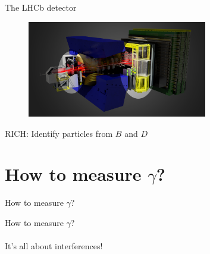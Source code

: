 \documentclass[dvipsnames]{beamer}
\begin{document}
\begin{frame}{The LHCb detector}
  \begin{figure}
    \centering
    \includegraphics[width = 0.7\textwidth]{Plots/LHCbDetector_RICH.png}
  \end{figure}
  \begin{center}
    \Large RICH: Identify particles from $B$ and $D$
  \end{center}
\end{frame}

\section{How to measure \texorpdfstring{$\gamma$}{gamma}?}
\begin{frame}{How to measure $\gamma$?}
  \begin{center}
    {\huge How to measure $\gamma$?}\\~\\
    {\large It's all about interferences!}
  \end{center}
\end{frame}
\end{document}
